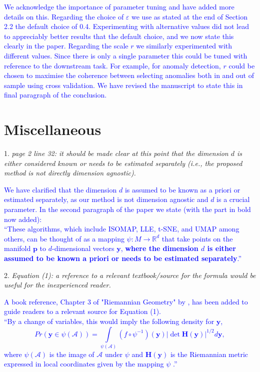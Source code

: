 \documentclass{article}
\begin{document}
   \textcolor{blue}{We acknowledge the importance of parameter tuning and have added more details on this. Regarding the choice of \(\varepsilon\) we use as stated at the end of Section 2.2 the default choice of 0.4. Experimenting with alternative values did not lead to appreciably better results that the default choice, and we now state this clearly in the paper. Regarding the scale $r$ we similarly experimented with different values. Since there is only a single parameter this could be tuned with reference to the downstream task. For example, for anomaly detection, $r$ could be chosen to maximise the coherence between selecting anomalies both in and out of sample using cross validation. We have revised the manuscript to state this in final paragraph of the conclusion.
   }

\section*{Miscellaneous}

1. \textit{page 2 line 32: it should be made clear at this point that the dimension \(d\) is either considered known or needs to be estimated separately (i.e., the proposed method is not directly dimension agnostic).}

   \textcolor{blue}{
   We have clarified that the dimension \(d\) is assumed to be known as a priori or estimated separately, as our method is not dimension agnostic and $d$ is a crucial parameter. In the second paragraph of the paper we state (with the part in bold now added):\\
  ``These algorithms, which include ISOMAP, LLE, t-SNE, and UMAP among others, can be thought of as a mapping \(\psi:M\rightarrow \mathbb{R}^d\) that take points on the manifold \(\bm{p}\) to \(d\)-dimensional vectors \(\bm{y}\), \textbf{where the dimension $d$ is either assumed to be known a priori or needs to be estimated separately}.'' }

2. \textit{Equation (1): a reference to a relevant textbook/source for the formula would be useful for the inexperienced reader.}

   \textcolor{blue}{A book reference, Chapter 3 of "Riemannian Geometry" by \cite{doCarmo1992-rm}, has been added to guide readers to a relevant source for Equation (1). \\
   ``By a change of variables, this would imply the following density for \(\bm{y}\),
\begin{equation}
\label{eq:changevar}
Pr(\bm{y}\in\psi(\mathcal{A}))=\int\limits_{\psi(\mathcal{A})} (f\circ\psi^{-1})(\bm{y})|\det \bm{H}(\bm{y})|^{1/2}d\bm{y},
\end{equation}
where \(\psi(\mathcal{A})\) is the image of \(\mathcal{A}\) under \(\psi\) and \(\bm{H}(\bm{y})\) is the Riemannian metric expressed in local coordinates given by the mapping \(\psi\) \autocite{doCarmo1992-rm}.''
   }
\end{document}
